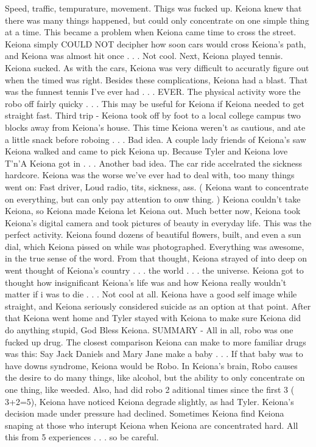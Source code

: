 \documentclass[12pt]{book}
\begin{document}
Speed, traffic, tempurature, movement. Thigs was fucked up. Keiona knew that there was many things happened, but could only concentrate on one simple thing at a time. This became a problem when Keiona came time to cross the street. Keiona simply COULD NOT decipher how soon cars would cross Keiona's path, and Keiona was almost hit once . . .  Not cool. Next, Keiona played tennis. Keiona sucked. As with the cars, Keiona was very difficult to accuratly figure out when the timed was right. Besides these complications, Keiona had a blast. That was the funnest tennis I've ever had . . .  EVER. The physical activity wore the robo off fairly quicky . . .  This may be useful for Keiona if Keiona needed to get straight fast. Third trip - Keiona took off by foot to a local college campus two blocks away from Keiona's house. This time Keiona weren't as cautious, and ate a little snack before roboing . . .  Bad idea. A couple lady friends of Keiona's saw Keiona walked and came to pick Keiona up. Because Tyler and Keiona love T'n'A Keiona got in . . .  Another bad idea. The car ride accelrated the sickness hardcore. Keiona was the worse we've ever had to deal with, too many things went on: Fast driver, Loud radio, tits, sickness, ass. ( Keiona want to concentrate on everything, but can only pay attention to onw thing. ) Keiona couldn't take Keiona, so Keiona made Keiona let Keiona out. Much better now, Keiona took Keiona's digital camera and took pictures of beauty in everyday life. This was the perfect activity. Keiona found dozens of beautiful flowers, built, and even a sun dial, which Keiona pissed on while was photographed. Everything was awesome, in the true sense of the word. From that thought, Keiona strayed of into deep on went thought of Keiona's country . . .  the world . . .  the universe. Keiona got to thought how insignificant Keiona's life was and how Keiona really wouldn't matter if i was to die . . .  Not cool at all. Keiona have a good self image while straight, and Keiona seriously considered suicide as an option at that point. After that Keiona went home and Tyler stayed with Keiona to make sure Keiona did do anything stupid, God Bless Keiona. SUMMARY - All in all, robo was one fucked up drug. The closest comparison Keiona can make to more familiar drugs was this: Say Jack Daniels and Mary Jane make a baby . . .  If that baby was to have downs syndrome, Keiona would be Robo. In Keiona's brain, Robo causes the desire to do many things, like alcohol, but the ability to only concentrate on one thing, like weeded. Also, had did robo 2 aditional times since the first 3 ( 3+2=5), Keiona have noticed Keiona degrade slightly, as had Tyler. Keiona's decision made under pressure had declined. Sometimes Keiona find Keiona snaping at those who interupt Keiona when Keiona are concentrated hard. All this from 5 experiences . . .  so be careful.
\end{document}
